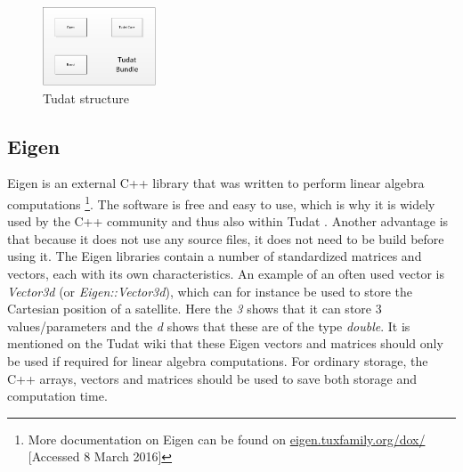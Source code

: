 \begin{figure}[H]
\centering
\includegraphics[width=0.3\textwidth]{figures/software/tudatBlock.png}
\caption{\ac{Tudat} structure}
\label{fig:tudatBlock}
\end{figure}

\subsection{Eigen}
\label{subsec:eigen}
Eigen is an external C++ library that was written to perform linear algebra computations \footnote{More documentation on Eigen can be found on \url{eigen.tuxfamily.org/dox/} [Accessed 8 March 2016] }. The software is free and easy to use, which is why it is widely used by the C++ community and thus also within \ac{Tudat} \citep{dirkx2016tudat}. Another advantage is that because it does not use any source files, it does not need to be build before using it. 
The Eigen libraries contain a number of standardized matrices and vectors, each with its own characteristics. An example of an often used vector is \textit{Vector3d} (or \textit{Eigen::Vector3d}), which can for instance be used to store the Cartesian position of a satellite. Here the \textit{3} shows that it can store 3 values/parameters and the \textit{d} shows that these are of the type \textit{double}. It is mentioned on the \ac{Tudat} wiki \citep{dirkx2016tudat} that these Eigen vectors and matrices should only be used if required for linear algebra computations. For ordinary storage, the C++ arrays, vectors and matrices should be used to save both storage and computation time.


